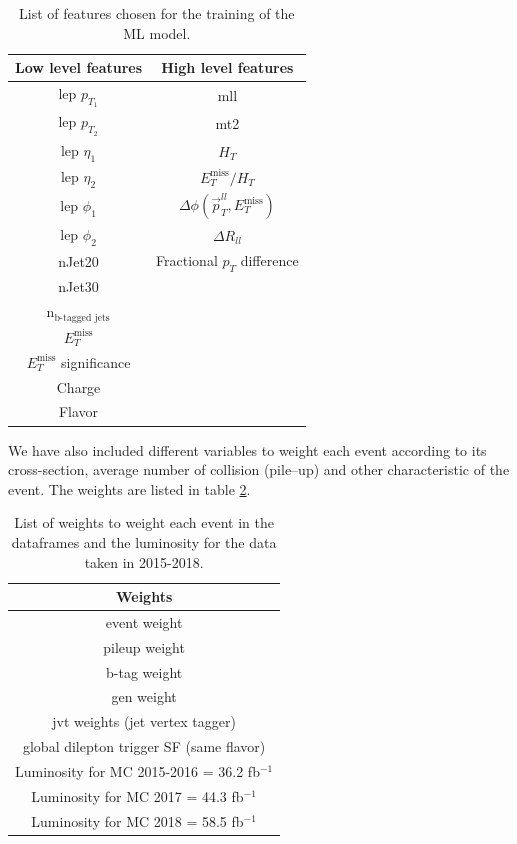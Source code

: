 \begin{table}[H]
    \centering
    \renewcommand{\arraystretch}{1.}
    \begin{tabular}{c c}
    \toprule
    \textbf{Low level features} & \textbf{High level features}\\
    \midrule
    \midrule
        lep $p_{T_1}$ & mll\\
        lep $p_{T_2}$ & mt2\\
        lep $\eta_1$ & $H_T$\\
        lep $\eta_2$ & $E_T^{\text{miss}}/H_T$\\
        lep $\phi_1$ & $\Delta \phi(\Vec{p}_T^{ll}, E_T^{\text{miss}})$\\
        lep $\phi_2$ & $\Delta R_{ll}$\\
        nJet20 & Fractional $p_T$ difference\\
        nJet30\\
        n$_{\text{b-tagged jets}}$\\
        $E_T^{\text{miss}}$\\
        $E_T^{\text{miss}}$ significance\\
        Charge\\
        Flavor\\
        \bottomrule
    \end{tabular}
    \caption{List of features chosen for the training of the ML model.}
    \label{tab:features}
\end{table}

We have also included different variables to weight each event according to its cross-section, average number of collision (pile--up) and other characteristic of the event. The weights are listed in table \ref{tab:eventWeights}.

\begin{table}[H]
    \centering
    \renewcommand{\arraystretch}{1.}
    \begin{tabular}{c}
    \toprule
    \textbf{Weights}\\
    \midrule
    \midrule
        event weight  \\
        pileup weight \\
        b-tag weight \\
        gen weight \\
        jvt weights (jet vertex tagger)\\
        global dilepton trigger SF (same flavor)\\
        Luminosity for MC 2015-2016 = 36.2 fb$^{-1}$\\
        Luminosity for MC 2017 = 44.3 fb$^{-1}$\\
        Luminosity for MC 2018 = 58.5 fb$^{-1}$\\
        \bottomrule
    \end{tabular}
    \caption{List of weights to weight each event in the dataframes and the luminosity for the data taken in 2015-2018.}
    \label{tab:eventWeights}
\end{table}

